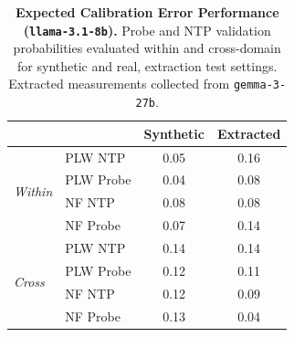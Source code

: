\begin{table}[ht]
\centering
\begin{tabular}{ll cc}
\toprule
& & Synthetic & Extracted \\
\midrule
\multirow{4}{*}{\textit{Within}}
& PLW NTP & 0.05 & 0.16 \\
& PLW Probe & 0.04 & 0.08 \\
& NF NTP & 0.08 & 0.08 \\
& NF Probe & 0.07 & 0.14 \\
\midrule
\multirow{4}{*}{\textit{Cross}}
& PLW NTP & 0.14 & 0.14 \\
& PLW Probe & 0.12 & 0.11 \\
& NF NTP & 0.12 & 0.09 \\
& NF Probe & 0.13 & 0.04 \\
\bottomrule
\end{tabular}
\caption{\textbf{Expected Calibration Error Performance (\texttt{llama-3.1-8b}).} Probe and NTP validation probabilities evaluated within and cross-domain for synthetic and real, extraction test settings. Extracted measurements collected from \texttt{gemma-3-27b}.}
\label{tab:llama-3.1-8b-gemma-3-27b}
\end{table}
